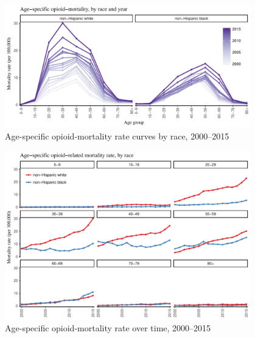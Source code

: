 \documentclass[12pt, a4paper]{article}
\begin{document}
%

\begin{figure}[h!]
 \centering
\includegraphics[width=0.95\textwidth]{./plots/paper_fig5_asmr_race_all.pdf} 
 \caption{Age-specific opioid-mortality rate curves by race, 2000--2015}
 \label{fig:asmr_curves}
\end{figure}

\begin{figure}[h!]
 \centering
\includegraphics[width=0.95\textwidth]{./plots/paper_fig6_age_spec_by_race.pdf} 
 \caption{Age-specific opioid-mortality rate over time, 2000--2015}
 \label{fig:asmr_time}
\end{figure}
\end{document}
